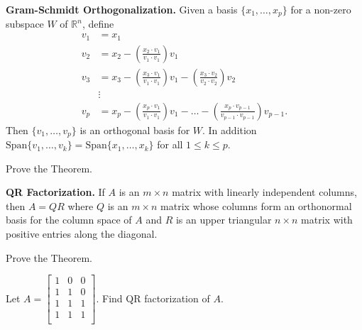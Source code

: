\documentclass[12pt,letterpaper]{article}
\begin{document}
\begin{enumerate}
\vfill

\newpage

{\bf Gram-Schmidt Orthogonalization.} Given a basis $\{x_1, \dots, x_p\}$ for a non-zero subspace $W$ of $\mathbb{R}^n$, define 
\begin{align*}
v_1 & = x_1\\
v_2 & = x_2 - \left( \frac{x_2 \cdot v_1}{v_1 \cdot v_1} \right) v_1\\
v_3 & = x_3 -\left( \frac{x_3 \cdot v_1}{v_1 \cdot v_1} \right) v_1-\left( \frac{x_3 \cdot v_2}{v_2 \cdot v_2} \right) v_2\\
&\vdots\\
v_p & = x_p -\left( \frac{x_p \cdot v_1}{v_1 \cdot v_1} \right) v_1-\dots -\left( \frac{x_p \cdot v_{p-1}}{v_{p-1} \cdot v_{p-1}} \right) v_{p-1}.
\end{align*}
Then $\{v_1, \dots, v_p\}$ is an orthogonal basis for $W$. In addition $\text{Span}\{v_1,\dots, v_k\}=\text{Span}\{ x_1, \dots, x_k\}$ for all $1 \leq k \leq p$.

\Problem Prove the Theorem.

\vfill

{\bf QR Factorization.} If $A$ is an $m\times n$ matrix with linearly independent columns, then $A=QR$ where $Q$ is an $m\times n$ matrix whose columns form an orthonormal basis for the column space of $A$ and $R$ is an upper triangular $n \times n$ matrix with positive entries along the diagonal. 

\Problem Prove the Theorem.

\vfill

\newpage

\Problem Let $A=\begin{bmatrix} 1 & 0 & 0\\ 1 & 1 & 0\\ 1 & 1 & 1\\ 1 & 1 & 1\\ \end{bmatrix}$. Find QR factorization of $A$.



\end{enumerate}
\end{document}
